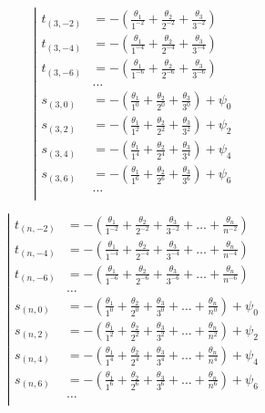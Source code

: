 \begin{equation*} \left| \begin{aligned}
t_{(3,-2)} &=
- \left(
  \frac{\theta_1}{1^{-2}}
+ \frac{\theta_2}{2^{-2}}
+ \frac{\theta_3}{3^{-2}} \right) \\
%
t_{(3,-4)} &=
- \left(
  \frac{\theta_1}{1^{-4}}
+ \frac{\theta_2}{2^{-4}}
+ \frac{\theta_3}{3^{-4}} \right) \\
%
t_{(3,-6)} &=
- \left(
  \frac{\theta_1}{1^{-6}}
+ \frac{\theta_2}{2^{-6}}
+ \frac{\theta_3}{3^{-6}} \right) \\
%
&\ldots \\
%
s_{(3,0)} &=
- \left(
  \frac{\theta_1}{1^0}
+ \frac{\theta_2}{2^0}
+ \frac{\theta_3}{3^0} \right)
+ \psi_0 \\
%
s_{(3,2)} &=
- \left(
  \frac{\theta_1}{1^2}
+ \frac{\theta_2}{2^2}
+ \frac{\theta_3}{3^2} \right)
+ \psi_2 \\
%
s_{(3,4)} &=
- \left(
  \frac{\theta_1}{1^4}
+ \frac{\theta_2}{2^4}
+ \frac{\theta_3}{3^4} \right)
+ \psi_4 \\
%
s_{(3,6)} &=
- \left(
  \frac{\theta_1}{1^6}
+ \frac{\theta_2}{2^6}
+ \frac{\theta_3}{3^6} \right)
+ \psi_6 \\
%
&\ldots \\
\end{aligned} \right. \end{equation*}

\begin{equation*} \left| \begin{aligned}
t_{(n,-2)} &=
- \left(
  \frac{\theta_1}{1^{-2}}
+ \frac{\theta_2}{2^{-2}}
+ \frac{\theta_3}{3^{-2}}
+ \ldots
+ \frac{\theta_n}{n^{-2}} \right) \\
%
t_{(n,-4)} &=
- \left(
  \frac{\theta_1}{1^{-4}}
+ \frac{\theta_2}{2^{-4}}
+ \frac{\theta_3}{3^{-4}}
+ \ldots
+ \frac{\theta_n}{n^{-4}} \right) \\
%
t_{(n,-6)} &=
- \left(
  \frac{\theta_1}{1^{-6}}
+ \frac{\theta_2}{2^{-6}}
+ \frac{\theta_3}{3^{-6}}
+ \ldots
+ \frac{\theta_n}{n^{-6}} \right) \\
%
&\ldots \\
%
s_{(n,0)} &=
- \left(
  \frac{\theta_1}{1^0}
+ \frac{\theta_2}{2^0}
+ \frac{\theta_3}{3^0}
+ \ldots
+ \frac{\theta_n}{n^0} \right)
+ \psi_0 \\
%
s_{(n,2)} &=
- \left(
  \frac{\theta_1}{1^2}
+ \frac{\theta_2}{2^2}
+ \frac{\theta_3}{3^2}
+ \ldots
+ \frac{\theta_n}{n^2} \right)
+ \psi_2 \\
%
s_{(n,4)} &=
- \left(
  \frac{\theta_1}{1^4}
+ \frac{\theta_2}{2^4}
+ \frac{\theta_3}{3^4}
+ \ldots
+ \frac{\theta_n}{n^4} \right)
+ \psi_4 \\
%
s_{(n,6)} &=
- \left(
  \frac{\theta_1}{1^6}
+ \frac{\theta_2}{2^6}
+ \frac{\theta_3}{3^6}
+ \ldots
+ \frac{\theta_n}{n^6} \right)
+ \psi_6 \\
%
&\ldots \\
\end{aligned} \right. \end{equation*}